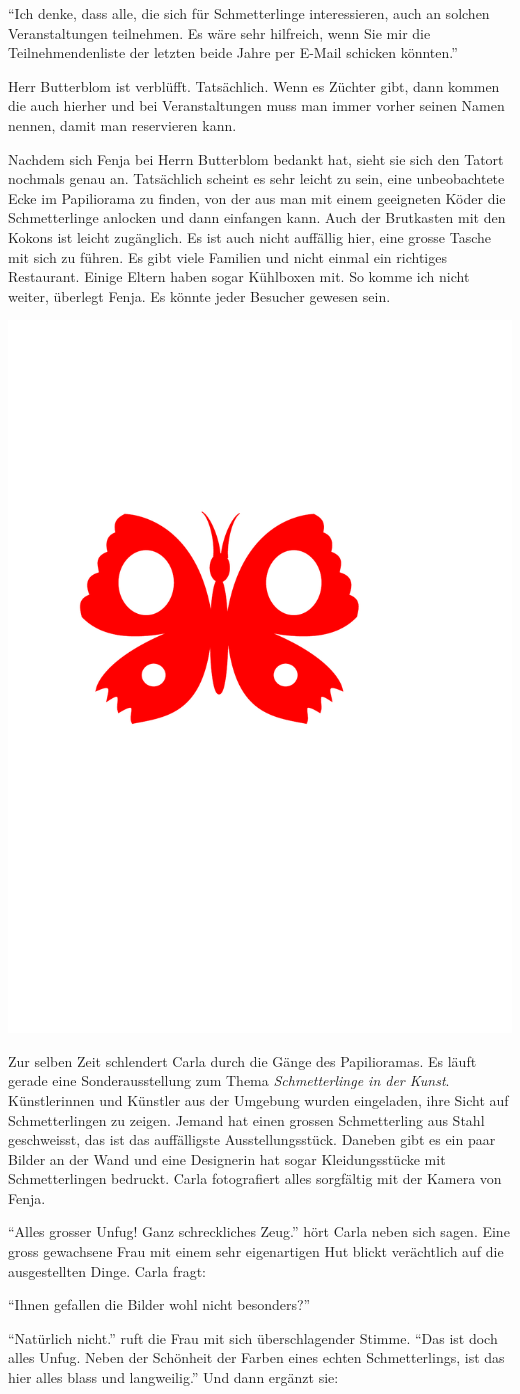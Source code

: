 \enquote{Ich denke, dass alle, die sich für Schmetterlinge interessieren, auch an solchen Veranstaltungen teilnehmen. Es wäre sehr hilfreich, wenn Sie mir die Teilnehmendenliste der letzten beide Jahre per E-Mail schicken könnten.}

Herr Butterblom ist verblüfft. Tatsächlich. Wenn es Züchter gibt, dann kommen die auch hierher und bei Veranstaltungen muss man immer vorher seinen Namen nennen, damit man reservieren kann. 

Nachdem sich Fenja bei Herrn Butterblom bedankt hat, sieht sie sich den Tatort nochmals genau an. Tatsächlich scheint es sehr leicht zu sein, eine unbeobachtete Ecke im Papiliorama zu finden, von der aus man mit einem geeigneten Köder die Schmetterlinge anlocken und dann einfangen kann. Auch der Brutkasten mit den Kokons ist leicht zugänglich. Es ist auch nicht auffällig hier, eine grosse Tasche mit sich zu führen. Es gibt viele Familien und nicht einmal ein richtiges Restaurant. Einige Eltern haben sogar Kühlboxen mit. So komme ich nicht weiter, überlegt Fenja. Es könnte jeder Besucher gewesen sein.
\begin{center}
\includegraphics[width=.05\textwidth]{bilder/inkling.pdf}
\end{center}
Zur selben Zeit schlendert Carla durch die Gänge des Papilioramas. Es läuft gerade eine Sonderausstellung zum Thema \emph{Schmetterlinge in der Kunst}. Künstlerinnen und Künstler aus der Umgebung wurden eingeladen, ihre Sicht auf Schmetterlingen zu zeigen. Jemand hat einen grossen Schmetterling aus Stahl geschweisst, das ist das auffälligste Ausstellungsstück. Daneben gibt es ein paar Bilder an der Wand und eine Designerin hat sogar Kleidungsstücke mit Schmetterlingen bedruckt. Carla fotografiert alles sorgfältig mit der Kamera von Fenja.

\enquote{Alles grosser Unfug! Ganz schreckliches Zeug.} hört Carla neben sich sagen. Eine gross gewachsene Frau mit einem sehr eigenartigen Hut blickt verächtlich auf die ausgestellten Dinge. Carla fragt:

\enquote{Ihnen gefallen die Bilder wohl nicht besonders?}

\enquote{Natürlich nicht.} ruft die Frau mit sich überschlagender Stimme. \enquote{Das ist doch alles Unfug. Neben der Schönheit der Farben eines echten Schmetterlings, ist das hier alles blass und langweilig.} Und dann ergänzt sie:

